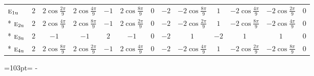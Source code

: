 \documentclass[10pt,a4paper]{article}
\newcommand{\needspace}[1]{\par\penalty-100\begingroup\dimen0=#1\relax\dimen2=\pagegoal
  \advance\dimen2-\pagetotal\ifdim\dimen0>\dimen2\relax\ifdim\dimen2>0pt\vfil\break\fi\fi
  \endgroup}
\numberwithin{equation}{section}
\newcommand{\irr}[1]{\text{\normalfont\scshape #1}}
\newcommand{\ptag}[1]{\mathrm{#1}}
\begin{document}
{{\begin{longtable}{@{}lcccccccccccc@{}}
$\irr{e}_{1\ptag{u}}$ & $2$ & $2\cos\tfrac{2\pi}{9}$ & $2\cos\tfrac{4\pi}{9}$ & $-1$ & $2\cos\tfrac{8\pi}{9}$ & $0$ & $-2$ & $-2\cos\tfrac{8\pi}{9}$ & $1$ & $-2\cos\tfrac{4\pi}{9}$ & $-2\cos\tfrac{2\pi}{9}$ & $0$\\*
$\irr{e}_{2\ptag{u}}$ & $2$ & $2\cos\tfrac{4\pi}{9}$ & $2\cos\tfrac{8\pi}{9}$ & $-1$ & $2\cos\tfrac{2\pi}{9}$ & $0$ & $-2$ & $-2\cos\tfrac{2\pi}{9}$ & $1$ & $-2\cos\tfrac{8\pi}{9}$ & $-2\cos\tfrac{4\pi}{9}$ & $0$\\*
$\irr{e}_{3\ptag{u}}$ & $2$ & $-1$ & $-1$ & $2$ & $-1$ & $0$ & $-2$ & $1$ & $-2$ & $1$ & $1$ & $0$\\*
$\irr{e}_{4\ptag{u}}$ & $2$ & $2\cos\tfrac{8\pi}{9}$ & $2\cos\tfrac{2\pi}{9}$ & $-1$ & $2\cos\tfrac{4\pi}{9}$ & $0$ & $-2$ & $-2\cos\tfrac{4\pi}{9}$ & $1$ & $-2\cos\tfrac{2\pi}{9}$ & $-2\cos\tfrac{8\pi}{9}$ & $0$\\
\bottomrule\end{longtable}}}
\needspace{103pt}
\end{document}
